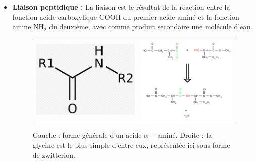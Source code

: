 \documentclass[11pt,a4paper]{report}
\begin{document}
\begin{itemize}
	\item \textbf{Liaison peptidique :}
	La liaison est le résultat de la réaction entre la fonction acide carboxylique $\text{COOH}$ du 		premier acide aminé et la fonction amine $\text{NH}_2$ du deuxième, avec comme produit secondaire 	une molécule d'eau.
	\begin{figure}[h!]
		\begin{center}
		\begin{tabular}{cc}
  			\includegraphics[scale = 0.5]{liaison_peptidique.png} &
   			\includegraphics[scale = 0.9]{formation_peptidique.png}\\
		\end{tabular}
		\caption{Gauche : forme générale d'un acide $\alpha-$aminé. Droite : la glycine est le plus 			simple d'entre eux, représentée ici sous forme de zwitterion.}
		\end{center}
	\end{figure}
	

\end{itemize}
\end{document}
